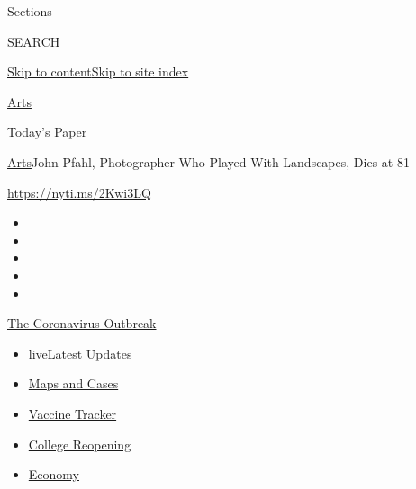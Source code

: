 Sections

SEARCH

\protect\hyperlink{site-content}{Skip to
content}\protect\hyperlink{site-index}{Skip to site index}

\href{https://www.nytimes3xbfgragh.onion/section/arts}{Arts}

\href{https://myaccount.nytimes3xbfgragh.onion/auth/login?response_type=cookie\&client_id=vi}{}

\href{https://www.nytimes3xbfgragh.onion/section/todayspaper}{Today's
Paper}

\href{/section/arts}{Arts}\textbar{}John Pfahl, Photographer Who Played
With Landscapes, Dies at 81

\url{https://nyti.ms/2Kwi3LQ}

\begin{itemize}
\item
\item
\item
\item
\item
\end{itemize}

\href{https://www.nytimes3xbfgragh.onion/news-event/coronavirus?action=click\&pgtype=Article\&state=default\&region=TOP_BANNER\&context=storylines_menu}{The
Coronavirus Outbreak}

\begin{itemize}
\tightlist
\item
  live\href{https://www.nytimes3xbfgragh.onion/2020/08/04/world/coronavirus-covid-19.html?action=click\&pgtype=Article\&state=default\&region=TOP_BANNER\&context=storylines_menu}{Latest
  Updates}
\item
  \href{https://www.nytimes3xbfgragh.onion/interactive/2020/us/coronavirus-us-cases.html?action=click\&pgtype=Article\&state=default\&region=TOP_BANNER\&context=storylines_menu}{Maps
  and Cases}
\item
  \href{https://www.nytimes3xbfgragh.onion/interactive/2020/science/coronavirus-vaccine-tracker.html?action=click\&pgtype=Article\&state=default\&region=TOP_BANNER\&context=storylines_menu}{Vaccine
  Tracker}
\item
  \href{https://www.nytimes3xbfgragh.onion/2020/08/02/us/covid-college-reopening.html?action=click\&pgtype=Article\&state=default\&region=TOP_BANNER\&context=storylines_menu}{College
  Reopening}
\item
  \href{https://www.nytimes3xbfgragh.onion/live/2020/08/03/business/stock-market-today-coronavirus?action=click\&pgtype=Article\&state=default\&region=TOP_BANNER\&context=storylines_menu}{Economy}
\end{itemize}

